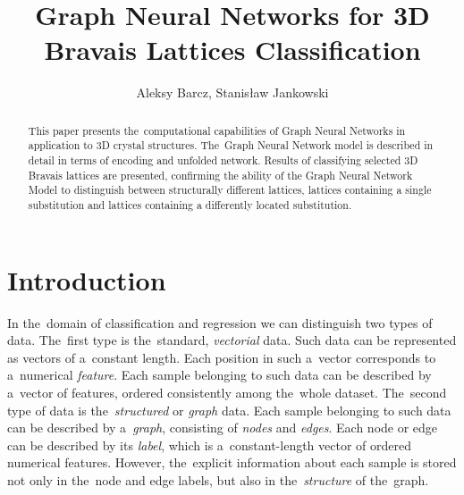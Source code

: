 \documentclass{llncs}
\title{Graph Neural Networks for 3D Bravais Lattices Classification}
\author{Aleksy Barcz, Stanis{\l}aw Jankowski}
\institute{Institute of Electronic Systems, Warsaw University of Technology, Warsaw, Poland
\email{abarcz@gmail.com, s.jankowski@ise.pw.edu.pl}
}
\begin{document}
\maketitle
%
\begin{abstract}
This paper presents the~computational capabilities of Graph Neural Networks in application to 3D crystal structures. The~Graph Neural Network model is described in detail in terms of encoding and unfolded network. Results of classifying selected 3D Bravais lattices are presented, confirming the ability of the Graph Neural Network Model to distinguish between structurally different lattices, lattices containing a single substitution and lattices containing a differently located substitution.
\end{abstract}

\section{Introduction}
In the~domain of classification and regression we can distinguish two types of data. The~first type is the~standard, \emph{vectorial} data. Such data can be represented as vectors of a~constant length. Each position in such a~vector corresponds to a~numerical \emph{feature}. Each sample belonging to such data can be described by a~vector of features, ordered consistently among the~whole dataset. The~second type of data is the~\emph{structured} or \emph{graph} data. Each sample belonging to such data can be described by a~\emph{graph}, consisting of \emph{nodes} and \emph{edges}. Each node or edge can be described by its \emph{label}, which is a~constant-length vector of ordered numerical features. However, the~explicit information about each sample is stored not only in the~node and edge labels, but also in the~\emph{structure} of the~graph.
\\\\
\end{document}
